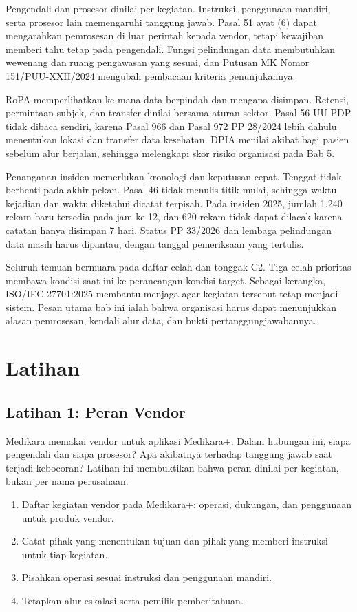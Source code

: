 Pengendali dan prosesor dinilai per kegiatan. Instruksi, penggunaan mandiri, serta prosesor lain
memengaruhi tanggung jawab. Pasal 51 ayat (6) dapat mengarahkan pemrosesan di luar perintah kepada
vendor, tetapi kewajiban memberi tahu tetap pada pengendali. Fungsi pelindungan data membutuhkan
wewenang dan ruang pengawasan yang sesuai, dan Putusan MK Nomor 151/PUU-XXII/2024 mengubah
pembacaan kriteria penunjukannya.

RoPA memperlihatkan ke mana data berpindah dan mengapa disimpan. Retensi, permintaan subjek, dan
transfer dinilai bersama aturan sektor. Pasal 56 UU PDP tidak dibaca sendiri, karena Pasal 966 dan
Pasal 972 PP 28/2024 lebih dahulu menentukan lokasi dan transfer data kesehatan. DPIA menilai akibat
bagi pasien sebelum alur berjalan, sehingga melengkapi skor risiko organisasi pada Bab 5.

Penanganan insiden memerlukan kronologi dan keputusan cepat. Tenggat tidak berhenti pada akhir
pekan. Pasal 46 tidak menulis titik mulai, sehingga waktu kejadian dan waktu diketahui dicatat
terpisah. Pada insiden 2025, jumlah 1.240 rekam baru tersedia pada jam ke-12, dan 620 rekam tidak
dapat dilacak karena catatan hanya disimpan 7 hari. Status PP 33/2026 dan lembaga pelindungan data
masih harus dipantau, dengan tanggal pemeriksaan yang tertulis.

Seluruh temuan bermuara pada daftar celah dan tonggak C2. Tiga celah prioritas membawa kondisi saat
ini ke perancangan kondisi target. Sebagai kerangka, ISO/IEC 27701:2025 membantu menjaga agar
kegiatan tersebut tetap menjadi sistem. Pesan utama bab ini ialah bahwa organisasi harus dapat
menunjukkan alasan pemrosesan, kendali alur data, dan bukti pertanggungjawabannya.

\section{Latihan}

\subsection*{Latihan 1: Peran Vendor}

Medikara memakai vendor untuk aplikasi Medikara+. Dalam hubungan ini, siapa pengendali dan siapa
prosesor? Apa akibatnya terhadap tanggung jawab saat terjadi kebocoran? Latihan ini membuktikan
bahwa peran dinilai per kegiatan, bukan per nama perusahaan.

\begin{enumerate}
  \item Daftar kegiatan vendor pada Medikara+: operasi, dukungan, dan penggunaan untuk produk
  vendor.
  \item Catat pihak yang menentukan tujuan dan pihak yang memberi instruksi untuk tiap kegiatan.
  \item Pisahkan operasi sesuai instruksi dan penggunaan mandiri.
  \item Tetapkan alur eskalasi serta pemilik pemberitahuan.
\end{enumerate}

